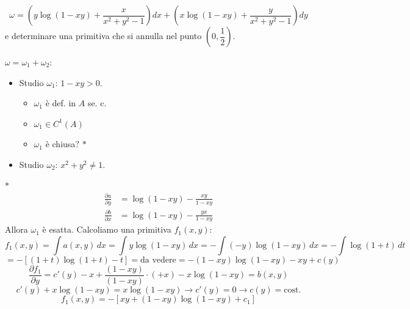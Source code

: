 \begin{esercizio}[EXE]
\[
\omega = \left( y \log(1 - xy) + \frac{x}{x^2 + y^2 - 1} \right) dx + \left( x \log(1 - xy) + \frac{y}{x^2 + y^2 - 1} \right) dy
\]
e determinare una primitiva che si annulla nel punto $\left(0, \dfrac{1}{2}\right)$.

$\omega = \omega_1 + \omega_2$:
\begin{itemize}
    \item Studio $\omega_1$: $1 - xy > 0$.
    \begin{itemize}
        \item $\omega_1$ è def. in $A$ se. c.
        \item $\omega_1 \in C^1(A)$
        \item $\omega_1$ è chiusa? $*$
    \end{itemize}
    \begin{center}
    \end{center}

    \item Studio $\omega_2$: $x^2 + y^2 \neq 1$.
    \begin{center}
    \end{center}
\end{itemize}
$*$
\begin{align*}
\frac{\partial a}{\partial y} &= \log(1 - xy) - \frac{xy}{1 - xy} \\[4pt]
\frac{\partial b}{\partial x} &= \log(1 - xy) - \frac{yx}{1 - xy}
\end{align*}
Allora $\omega_1$ è esatta. Calcoliamo una primitiva $f_1(x, y)$:
\[
f_1(x, y) = \int a(x, y)\, dx = \int y \log(1 - xy)\, dx = -\int (-y) \log(1 - xy)\, dx = -\int \log(1 + t)\, dt
\]
\[
= -\left[ (1 + t)\log(1 + t) - t \right] = \text{da vedere} = -(1 - xy)\log(1 - xy) - xy + c(y)
\]
\[
\frac{\partial f_1}{\partial y} = c'(y) - x + \frac{(1 - xy)}{(1 - xy)} \cdot (+x) - x \log(1 - xy) = b(x, y)
\]
\[
c'(y) + x \log(1 - xy) = x \log(1 - xy) \to c'(y) = 0 \to c(y) = \text{cost.}
\]
\[
f_1(x, y) = -\left[ xy + (1 - xy)\log(1 - xy) + c_1 \right]
\]


\end{esercizio}
